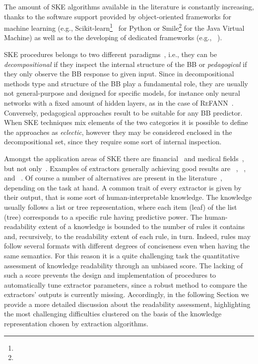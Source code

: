 \documentclass[sigconf]{acmart}
\begin{document}
The amount of SKE algorithms available in the literature is constantly increasing, thanks to the software support provided by object-oriented frameworks for machine learning (e.g., Scikit-learn\footnote{}~\cite{PedregosaVGMTGBPWDVPCBPD11} for Python or Smile\footnote{} for the Java Virtual Machine) as well as to the developing of dedicated frameworks (e.g., \psyke{}~\cite{psyke-woa2021,psyke-ia2022,psyke-extraamas2022}).

SKE procedures belongs to two different paradigms~\cite{andrews1995survey}, i.e., they can be \emph{decompositional} if they inspect the internal structure of the BB or \emph{pedagogical} if they only observe the BB response to given input.
%
Since in decompositional methods type and structure of the BB play a fundamental role, they are usually not general-purpose and designed for specific models, for instance only neural networks with a fixed amount of hidden layers, as in the case of \textsc{ReFANN}~\cite{setiono2002extraction}.
%
Conversely, pedagogical approaches result to be suitable for any BB predictor.
%
When SKE techniques mix elements of the two categories it is possible to define the approaches as \emph{eclectic}, however they may be considered enclosed in the decompositional set, since they require some sort of internal inspection.

Amongst the application areas of SKE there are financial~\cite{baesens2001building,baesens2003using,steiner2006using} and medical fields~\cite{bologna1997three,franco2007early,hayashi2000comparison}, but not only~\cite{setiono2011rule,sabbatini22LPFSKE,azcarraga2012keyword,hofmann2003rule}.
%
Examples of extractors generally achieving good results are \cart{}~\cite{breiman1984classification}, \trepan{}~\cite{craven1996extracting}, \gridex{}~\cite{gridex-extraamas2021} and \gridrex{}~\cite{gridrex-kr2022}.
%
Of course a number of alternatives are present in the literature~\cite{craven1994using,huysmans2006iter,barakat2005eclectic,martens2007comprehensible}, depending on the task at hand.
%
A common trait of every extractor is given by their output, that is some sort of human-interpretable knowledge.
%
The knowledge usually follows a list or tree representation, where each item (leaf) of the list (tree) corresponds to a specific rule having predictive power.
%
The human-readability extent of a knowledge is bounded to the number of rules it contains and, recursively, to the readability extent of each rule, in turn.
%
Indeed, rules may follow several formats with different degrees of conciseness even when having the same semantics.
%
For this reason it is a quite challenging task the quantitative assessment of knowledge readability through an unbiased score.
%
The lacking of such a score prevents the design and implementation of procedures to automatically tune extractor parameters, since a robust method to compare the extractors' outputs is currently missing.
%
Accordingly, in the following Section we provide a more detailed discussion about the readability assessment, highlighting the most challenging difficulties clustered on the basis of the knowledge representation chosen by extraction algorithms.
\end{document}
